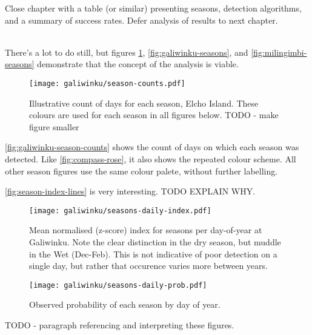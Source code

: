 Close chapter with a table (or similar) presenting seasons, detection
algorithms, and a summary of success rates.  Defer analysis of results
to next chapter.

~\\

There's a lot to do still, but figures \ref{fig:galiwinku-season-counts},
\ref{fig:galiwinku-seasons}, and \ref{fig:milingimbi-seasons}
demonstrate that the concept of the analysis is viable.

\begin{figure}[h]
    \centering
    \texttt{[image: galiwinku/season-counts.pdf]}
    \caption[Calculated season frequency, Elcho Island]{
        Illustrative count of days for each season, Elcho Island.
        These colours are used for each season in all figures below.
        TODO - make figure smaller
        }
    \label{fig:galiwinku-season-counts}
\end{figure}

\autoref{fig:galiwinku-season-counts} shows the count of days on which
each season was detected.  Like \autoref{fig:compass-rose}, it also
shows the repeated colour scheme.  All other season figures use the
same colour palete, without further labelling.

\autoref{fig:season-index-lines} is very interesting.  TODO EXPLAIN WHY.

\begin{figure}[h]
    \centering
    \texttt{[image: galiwinku/seasons-daily-index.pdf]}
    \caption[Season index by day-of-year, Elcho Island]{
        Mean normalised (z-score) index for seasons per day-of-year
        at Galiwinku.  Note the clear distinction in the dry season,
        but muddle in the Wet (Dec-Feb).
        This is not indicative of poor detection on a single day,
        but rather that occurence varies more between years.
        }
    \label{fig:season-daily-lines}
\end{figure}


\begin{figure}[h]
    \centering
    \texttt{[image: galiwinku/seasons-daily-prob.pdf]}
    \caption[Season probability by day-of-year, Elcho Island]{
        Observed probability of each season by day of year.
        }
    \label{fig:season-daily-prob}
\end{figure}




TODO - paragraph referencing and interpreting these figures.

